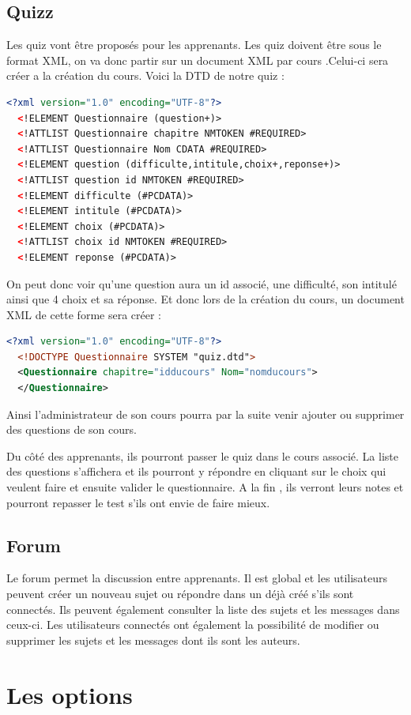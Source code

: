 \documentclass[a4paper,11pt]{article}
\begin{document}
\subsection{Quizz}
Les quiz vont être proposés pour les apprenants. Les quiz doivent être sous le format XML, on va donc partir sur un document XML par cours .Celui-ci sera créer a la création du cours.
Voici la DTD de notre quiz : 
\begin{lstlisting}[language=XML]
  <?xml version="1.0" encoding="UTF-8"?>
  <!ELEMENT Questionnaire (question+)>
  <!ATTLIST Questionnaire chapitre NMTOKEN #REQUIRED>
  <!ATTLIST Questionnaire Nom CDATA #REQUIRED>
  <!ELEMENT question (difficulte,intitule,choix+,reponse+)>
  <!ATTLIST question id NMTOKEN #REQUIRED>
  <!ELEMENT difficulte (#PCDATA)>
  <!ELEMENT intitule (#PCDATA)>
  <!ELEMENT choix (#PCDATA)>
  <!ATTLIST choix id NMTOKEN #REQUIRED>
  <!ELEMENT reponse (#PCDATA)>
\end{lstlisting}
On peut donc voir qu'une question aura un id associé, une difficulté, son intitulé ainsi que 4 choix et sa réponse.
Et donc lors de la création du cours, un document XML de cette forme sera créer : 
\begin{lstlisting}[language=XML]
  <?xml version="1.0" encoding="UTF-8"?>
  <!DOCTYPE Questionnaire SYSTEM "quiz.dtd">
  <Questionnaire chapitre="idducours" Nom="nomducours"> 
  </Questionnaire>
\end{lstlisting} 

Ainsi l'administrateur de son cours pourra par la suite venir ajouter ou supprimer des questions de son cours. 

Du côté des apprenants, ils pourront passer le quiz dans le cours associé. La liste des questions s'affichera et ils pourront y répondre en cliquant sur le choix qui veulent faire et ensuite valider le questionnaire.
A la fin , ils verront leurs notes et pourront repasser le test s'ils ont envie de faire mieux.
\subsection{Forum}
Le forum permet la discussion entre apprenants. Il est global et les utilisateurs peuvent créer un nouveau sujet ou répondre dans un déjà créé s'ils sont connectés. Ils peuvent également consulter la liste des sujets et les messages dans ceux-ci. Les utilisateurs connectés ont également la possibilité de modifier ou supprimer les sujets et les messages dont ils sont les auteurs. 


\section{Les options}
\end{document}
